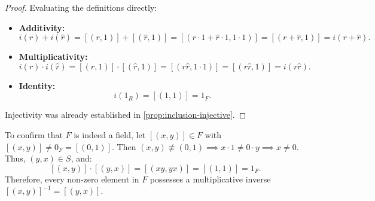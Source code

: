 \begin{content}
\begin{proof}
Evaluating the definitions directly:
\begin{itemize}
    \item \textbf{Additivity:}
    \[
    i(r) + i(\hat{r}) = [(r, 1)] + [(\hat{r}, 1)] = [(r \cdot 1 + \hat{r} \cdot 1, 1 \cdot 1)] = [(r + \hat{r}, 1)] = i(r + \hat{r}).
    \]
    \item \textbf{Multiplicativity:}
    \[
    i(r) \cdot i(\hat{r}) = [(r, 1)] \cdot [(\hat{r}, 1)] = [(r \hat{r}, 1 \cdot 1)] = [(r \hat{r}, 1)] = i(r \hat{r}).
    \]
    \item \textbf{Identity:}
    \[
    i(1_R) = [(1, 1)] = 1_F.
    \]
\end{itemize}
Injectivity was already established in \cref{prop:inclusion-injective}.
\end{proof}

\begin{steps}
To confirm that $F$ is indeed a field, let $[(x, y)] \in F$ with $[(x, y)] \ne 0_F = [(0, 1)]$. Then $(x, y) \not\equiv (0, 1) \implies x \cdot 1 \ne 0 \cdot y \implies x \ne 0$. Thus, $(y, x) \in S$, and:
\[
[(x, y)] \cdot [(y, x)] = [(xy, yx)] = [(1, 1)] = 1_F.
\]
Therefore, every non-zero element in $F$ possesses a multiplicative inverse $[(x, y)]^{-1} = [(y, x)]$.
\end{steps}
\end{content}

